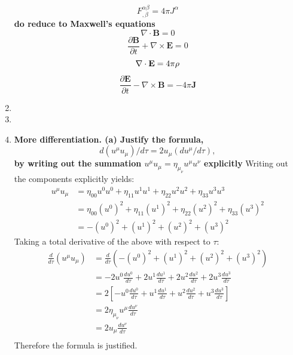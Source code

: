 \documentclass[9pt]{report}
\begin{document}
\begin{enumerate}
\begin{equation}
    F^{\alpha\beta}_{,\beta} = 4\pi J^\alpha
  \end{equation}
  \textbf{do reduce to Maxwell's equations}
  \begin{equation}
    \nabla \cdot \textbf{B} = 0
  \end{equation}
  \begin{equation}
    \frac{\partial \textbf{B}}{\partial t} + \nabla \times \textbf{E} = 0
  \end{equation}
  \begin{equation}
    \nabla \cdot \textbf{E} = 4\pi \bf{\rho}
  \end{equation}
  \begin{equation}
    \frac{\partial \textbf{E}}{\partial t} - \nabla \times \textbf{B} = -4\pi \textbf{J}
  \end{equation}
\item
\item
\item \textbf{More differentiation. (a) Justify the formula,}
  \[
    d(u^\mu u_\mu) / d\tau = 2 u_\mu (d u^\mu / d\tau),
  \]
  \textbf{by writing out the summation $u^\mu u_\mu = \eta_\mu_\nu u^\mu u^\nu$ explicitly}
  Writing out the components explicitly yields:
  \[
    \begin{align}
    u^\mu u_\mu &= \eta_{00} u^0 u^0 + \eta_{11} u^1 u^1 + \eta_{22} u^2 u^2 + \eta_{33} u^3 u^3\\
                &= \eta_{00} (u^0)^2 + \eta_{11} (u^1)^2 + \eta_{22} (u^2)^2 + \eta_{33} (u^3)^2 \\
                &= - (u^0)^2 + (u^1)^2 + (u^2)^2 + (u^3)^2
  \end{align}
  \]
  Taking a total derivative of the above with respect to $\tau$:
  \[
    \begin{align}
    \frac{d}{d\tau} (u^\mu u_\mu) &= \frac{d}{d\tau} (-(u^0)^2 + (u^1)^2 + (u^2)^2 + (u^3)^2) \\
                                  &= -2 u^0 \frac{du^0}{d\tau} + 2 u^1 \frac{du^1}{d\tau} + 2 u^2 \frac{du^2}{d\tau}+ 2 u^3 \frac{du^3}{d\tau}\\
                                  &= 2 [ -u^0 \frac{du^0}{d\tau} + u^1 \frac{du^1}{d\tau} + u^2 \frac{du^2}{d\tau}+ u^3 \frac{du^3}{d\tau} ] \\
                                  &= 2 \eta_\mu_\nu u^\mu \frac{du^\nu}{d\tau}\\
                                  &= 2 u_\mu \frac{du^\nu}{d\tau}\\
    \end{align}
  \]
  Therefore the formula is justified.


\end{enumerate}
\end{document}
